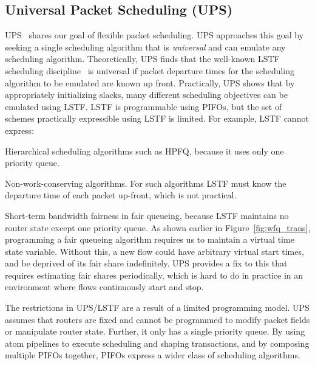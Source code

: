 \subsection{Universal Packet Scheduling (UPS)} UPS~\cite{ups} shares our goal
of flexible packet scheduling. UPS approaches this goal by seeking a single
scheduling algorithm that is {\em universal} and can emulate any scheduling
algorithm. Theoretically, UPS finds that the well-known LSTF scheduling
discipline~\cite{lstf} is universal if packet departure times for the
scheduling algorithm to be emulated are known up front. Practically, UPS shows
that by appropriately initializing slacks, many different scheduling objectives
can be emulated using LSTF. LSTF is programmable using PIFOs, but the set of
schemes practically expressible using LSTF is limited. For example, LSTF cannot
express:
\begin{CompactEnumerate}
\item Hierarchical scheduling algorithms such as HPFQ, because it uses only one
priority queue.
\item Non-work-conserving algorithms. For such algorithms LSTF must know the
departure time of each packet up-front, which is not practical.
\item Short-term bandwidth fairness in fair queueing, because LSTF maintains no
  router state except one priority queue. As shown earlier in
  Figure~\ref{fig:wfq_trans}, programming a fair queueing algorithm requires us
  to maintain a virtual time state variable. Without this, a new flow could have
  arbitrary virtual start times, and be deprived of its fair share indefinitely.
  UPS provides a fix to this that requires estimating fair shares periodically,
  which is hard to do in practice in an environment where flows continuously start
  and stop.
\end{CompactEnumerate}
The restrictions in UPS/LSTF are a result of a limited programming model. UPS
assumes that routers are fixed and cannot be programmed to modify packet fields
or manipulate router state. Further, it only has a single priority queue.  By
using atom pipelines to execute scheduling and shaping transactions, and by
composing multiple PIFOs together, PIFOs express a wider class of scheduling
algorithms.

